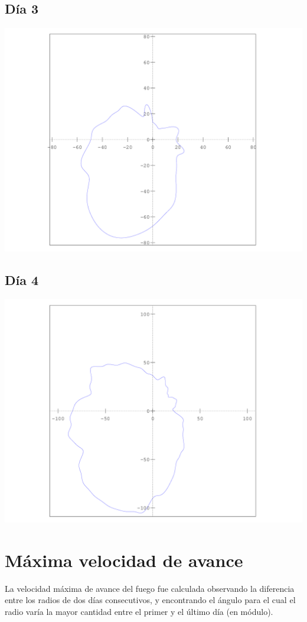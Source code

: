 \documentclass[12pt,spanish]{article}
\begin{document}
\subsection*{Día 3}
\includegraphics[scale=0.7]{../salida/dia3.png}
\subsection*{Día 4}
\includegraphics[scale=0.7]{../salida/dia4.png}

\section*{Máxima velocidad de avance}
La velocidad máxima de avance del fuego fue calculada observando la diferencia entre los radios de dos días consecutivos, y encontrando el ángulo para el cual el radio varía la mayor cantidad entre el primer y el último día (en módulo).
\end{document}
